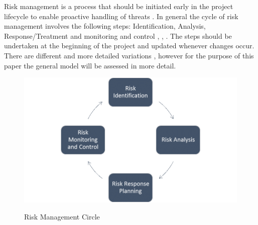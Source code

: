 Risk management is a process that should be initiated early in the project lifecycle to enable proactive handling of threats \cite{islamSoftwareDevelopmentRisk2011}. In general the cycle of risk management involves the following steps: Identification, Analysis, Response/Treatment and monitoring and control \cite{islamSoftwareDevelopmentRisk2011}, \cite{teschITProjectRisk2007}, \cite{didragaRoleEffectsRisk2013}. The steps should be undertaken at the beginning of the project and updated whenever changes occur. There are different and more detailed variations \cite{teschITProjectRisk2007}, however for the purpose of this paper the general model will be assessed in more detail. \\

\begin{figure}[htbp] 
	\centering
	\includegraphics[width=1.0\textwidth]{Content/Theory/RiskManagementCycle.png}
	\caption{Risk Management Circle}
	\cite{Eigene Darstellung}
	\label{fig:riskmanagmentcycle}
\end{figure}

